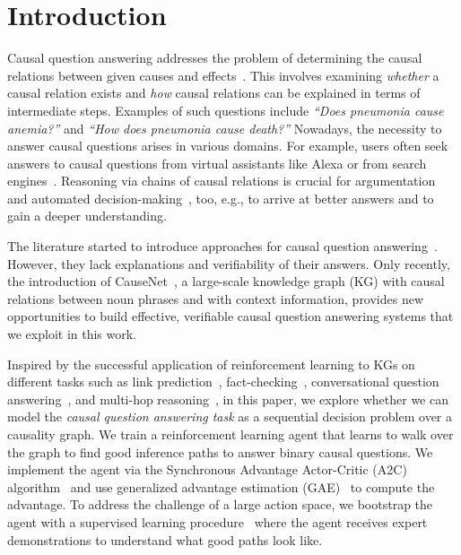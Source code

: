 \newpage
\section{Introduction}

Causal question answering addresses the problem of determining the causal relations between given causes and effects~\cite{KayeshCausalTransfer2020, DalalCausalQAEnhancing2021}. This involves examining \emph{whether} a causal relation exists and \emph{how} causal relations can be explained in terms of intermediate steps. Examples of such questions include \textit{``Does pneumonia cause anemia?''} and \textit{``How does pneumonia cause death?''} Nowadays, the necessity to answer causal questions arises in various domains. For example, users often seek answers to causal questions from virtual assistants like Alexa or from search engines~\cite{Nguyen2016MSMARCO, Heindorf2020Causenet}. Reasoning via chains of causal relations is crucial for argumentation~\cite{Walton2007Dialog, Habernal2018Argumentation} and automated decision-making~\cite{HassanzadeshCausalQA2019, KayeshCausalTransfer2020, Heindorf2020Causenet}, too, e.g., to arrive at better answers and to gain a deeper understanding.

The literature started to introduce approaches for causal question answering~\cite{SharpCausalQAEmbeddings2016, HassanzadeshCausalQA2019, KayeshCausalTransfer2020, DalalCausalQAISWC2021}. However, they lack explanations and verifiability of their answers. Only recently, the introduction of CauseNet~\cite{Heindorf2020Causenet}, a large-scale knowledge graph (KG) with causal relations between noun phrases and with context information, provides new opportunities to build effective, verifiable causal question answering systems that we exploit in this work.

Inspired by the successful application of reinforcement learning to KGs on different tasks such as link prediction~\cite{Xiong2017DeePpath}, fact-checking~\cite{Das2018Minerva}, conversational question answering~\cite{Kaiser2021Reinforcement}, and multi-hop reasoning~\cite{Wan2021GaussianPath}, in this paper, we explore whether we can model the \emph{causal question answering task} as a sequential decision problem over a causality graph. We train a reinforcement learning agent that learns to walk over the graph to find good inference paths to answer binary causal questions. We implement the agent via the Synchronous Advantage Actor-Critic (A2C) algorithm~\cite{Mnih2016A2C} and use generalized advantage estimation (GAE)~\cite{Schulman2016GAE} to compute the advantage. To address the challenge of a large action space, we bootstrap the agent with a supervised learning procedure~\cite{Xiong2017DeePpath} where the agent receives expert demonstrations to understand what good paths look like.

